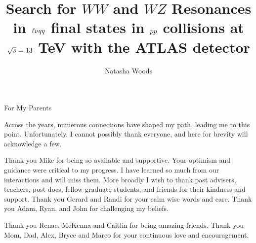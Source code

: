 





\title{Search for $WW$ and $WZ$ Resonances in $\ell\nu \MakeLowercase{qq}$ final states in $\MakeLowercase{pp}$ collisions at $\sqrt{\MakeLowercase{s}}=13$ TeV with the ATLAS detector}
\author{Natasha Woods}
\deanlinethree{}

\begin{frontmatter}
\maketitle

\copyrightpage

\tableofcontents


\listoffigures

\listoftables
\begin{abstract}

\end{abstract}

\begin{dedication}
\vspace*{\fill}
\begin{center}
For My Parents
\end{center}
\vspace*{\fill}
\end{dedication}
\begin{acknowledgements}
Across the years, numerous connections have shaped my path, leading me to this point. Unfortunately, I cannot possibly thank everyone, and here for brevity will acknowledge a few.

Thank you Mike for being so available and supportive. Your optimism and guidance were critical to my progress. I have learned so much from our interactions and will miss them. More broadly I wish to thank past advisers, teachers, post-docs, fellow graduate students, and friends for their kindness and support. Thank you Gerard and Randi for your calm wise words and care. Thank you Adam, Ryan, and John for challenging my beliefs. 

Thank you Renae, McKenna and Caitlin for being amazing friends. Thank you Mom, Dad, Alex, Bryce and Marco for your continuous love and encouragement. 
\end{acknowledgements}

\end{frontmatter}
